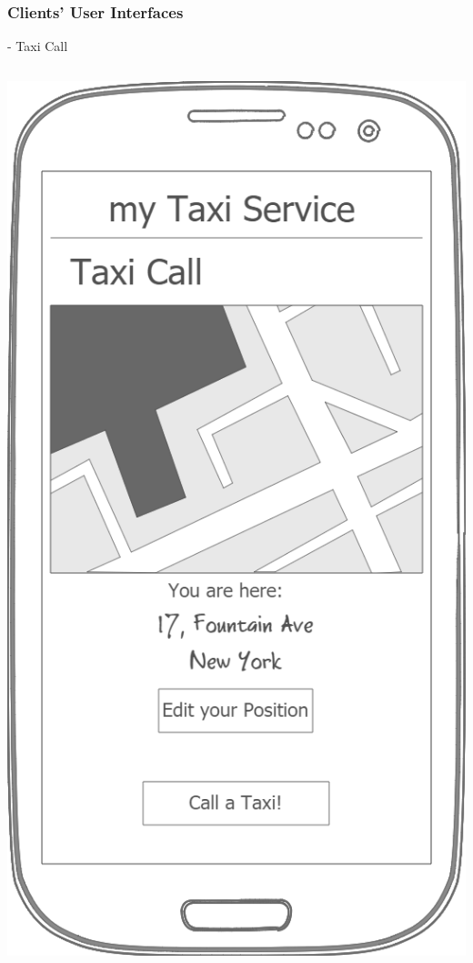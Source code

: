 \documentclass[9pt]{beamer}
\makeatletter
\newcommand*{\currentname}{\@currentlabelname}
\makeatother
\begin{document}
\subsubsection{Clients' User Interfaces}
\begin{frame}{\currentname{} - Taxi Call}
\begin{columns}[c]
  \begin{column}{.5\textwidth}
		\includegraphics[height=.8\textheight]{Mockup-ClientsTaxiCall}

\end{column}
\end{columns}
\end{frame}
\end{document}
